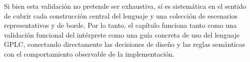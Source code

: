 Si bien esta validación no pretende ser exhaustiva, sí es sistemática
en el sentido de cubrir cada construcción central del lenguaje y una
colección de escenarios representativos y de borde. Por lo tanto, el
capítulo funciona tanto como una validación funcional del intérprete
como una guía concreta de uso del lenguaje GPLC, conectando
directamente las decisiones de diseño y las reglas semánticas con el
comportamiento observable de la implementación.
